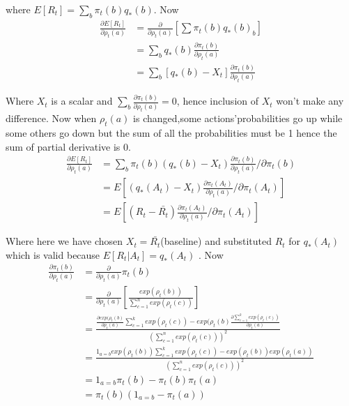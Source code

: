 \documentclass[a4paper,english]{article}
\begin{document}
\begin{enumerate}
where $E[R_{t}]=\sum_{b}\pi_{t}(b)q_{*}(b)$. Now
\begin{align*}
\frac{\partial E[R_{t}]}{\partial\rho_{t}(a)} & =\frac{\partial}{\partial\rho_{t}(a)}[\sum\pi_{t}(b)q_{*}(b)_{b}]\\
 & =\sum_{b}q_{*}(b)\frac{\partial\pi_{t}(b)}{\partial\rho_{t}(a)}\\
 & =\sum_{b}[q_{*}(b)-X_{t}]\frac{\partial\pi_{t}(b)}{\partial\rho_{t}(a)}
\end{align*}

Where $X_{t}$ is a scalar and $\sum_{b}\frac{\partial\pi_{t}(b)}{\partial\rho_{t}(a)}=0$,
hence inclusion of $X_{t}$ won't make any difference. Now when $\rho_{t}(a)$
is changed,some actions'probabilities go up while some others go down
but the sum of all the probabilities must be 1 hence the sum of partial
derivative is 0.
\begin{align}
\frac{\partial E[R_{t}]}{\partial\rho_{t}(a)} & =\sum_{b}\pi_{t}(b)(q_{*}(b)-X_{t})\frac{\partial\pi_{t}(b)}{\partial\rho_{t}(a)}/\partial\pi_{t}(b)\nonumber \\
 & =E[(q_{*}(A_{t})-X_{t})\frac{\partial\pi_{t}(A_{t})}{\partial\rho_{t}(a)}/\partial\pi_{t}(A_{t})]\label{A(t) is the random variable}\\
 & =E[(R_{t}-\bar{R_{t}})\frac{\partial\pi_{t}(A_{t})}{\partial\rho_{t}(a)}/\partial\pi_{t}(A_{t})]
\end{align}

Where here we have chosen $X_{t}=\bar{R_{t}}$(baseline) and substituted
$R_{t}$ for $q_{*}(A_{t})$ which is valid because $E[R_{t}|A_{t}]=q_{*}(A_{t})$
. Now
\begin{align}
\frac{\partial\pi_{t}(b)}{\partial\rho_{t}(a)} & =\frac{\partial}{\partial\rho_{t}(a)}\pi_{t}(b)\nonumber \\
 & =\frac{\partial}{\partial\rho_{t}(a)}[\frac{exp(\rho_{t}(b))}{\sum_{c=1}^{n}exp(\rho_{t}(c))}]\nonumber \\
 & =\frac{\frac{\partial exp(\rho_{t}(b)}{\partial\rho_{t}(a)}\sum_{c=1}^{k}exp(\rho_{t}(c))-exp(\rho_{t}(b)\frac{\partial\sum_{c=1}^{k}exp(\rho_{t}(c))}{\partial\rho_{t}(a)}}{(\sum_{c=1}^{n}exp(\rho_{t}(c)))^{2}}\nonumber \\
 & =\frac{1_{a=b}exp(\rho_{t}(b))\sum_{c=1}^{k}exp(\rho_{t}(c))-exp(\rho_{t}(b))exp(\rho_{t}(a))}{(\sum_{c=1}^{n}exp(\rho_{t}(c)))^{2}}\nonumber \\
 & =1_{a=b}\pi_{t}(b)-\pi_{t}(b)\pi_{t}(a)\nonumber \\
 & =\pi_{t}(b)(1_{a=b}-\pi_{t}(a))\label{eq}
\end{align}


\end{enumerate}
\end{document}
